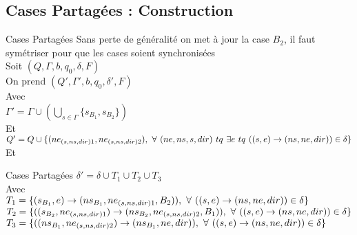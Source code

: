 \documentclass[12pt]{beamer}
\begin{document}
\subsection{Cases Partagées : Construction}
\begin{frame}{Cases Partagées}
    Sans perte de généralité on met à jour la case $B_2$, il faut symétriser pour que les cases soient synchronisées\\
    Soit $(Q, \Gamma, b, q_0, \delta, F)$\\
    On prend $(Q', \Gamma', b, q_0, \delta', F)$\\
    Avec\\
    $\Gamma' = \Gamma \cup (\bigcup\limits_{s\in\Gamma} \{s_{B_1}, s_{B_2}\})$\\
    Et\\
    $Q' = Q \cup \{(ne_{(s,ns,dir)1},ne_{(s,ns,dir)2}),\hspace{0.125cm}\forall \hspace{0.125cm} (ne,ns,s,dir) \hspace{0.125cm} tq \hspace{0.125cm} \exists e \hspace{0.125cm} tq  \hspace{0.125cm} ((s,e)\rightarrow(ns,ne,dir)) \in \delta\} $ \\
    Et\\
\end{frame}
\begin{frame}{Cases Partagées}
    $\delta' = \delta \cup T_1 \cup T_2 \cup T_3$\\
    Avec\\
    $T_1 = \{(s_{B_1},e)\rightarrow(ns_{B_1},ne_{(s,ns,dir)1},B_2)),\hspace{0.125cm}
    \forall \hspace{0.125cm} ((s,e)\rightarrow(ns,ne,dir)) \in \delta\}$\\
    $T_2 = \{((s_{B_2},ne_{(s,ns,dir)1})\rightarrow(ns_{B_2},ne_{(s,ns,dir)2},B_1)),\hspace{0.125cm}
    \forall \hspace{0.125cm} ((s,e)\rightarrow(ns,ne,dir)) \in \delta\}$\\
    $T_3 = \{((ns_{B_1},ne_{(s,ns,dir)2})\rightarrow(ns_{B_1},ne,dir)),\hspace{0.125cm}
    \forall \hspace{0.125cm} ((s,e)\rightarrow(ns,ne,dir)) \in \delta\}$\\
\end{frame}
\end{document}
